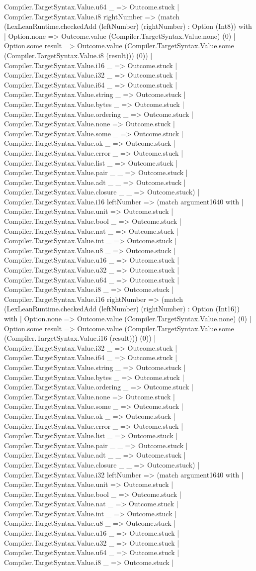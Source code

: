 \documentclass[11pt]{article}
\begin{document}
Compiler.TargetSyntax.Value.u64 \_ => Outcome.stuck | Compiler.TargetSyntax.Value.i8 rightNumber => (match (LexLeanRuntime.checkedAdd (leftNumber) (rightNumber) : Option (Int8)) with | Option.none => Outcome.value (Compiler.TargetSyntax.Value.none) (0) | Option.some result => Outcome.value (Compiler.TargetSyntax.Value.some (Compiler.TargetSyntax.Value.i8 (result))) (0)) | Compiler.TargetSyntax.Value.i16 \_ => Outcome.stuck | Compiler.TargetSyntax.Value.i32 \_ => Outcome.stuck | Compiler.TargetSyntax.Value.i64 \_ => Outcome.stuck | Compiler.TargetSyntax.Value.string \_ => Outcome.stuck | Compiler.TargetSyntax.Value.bytes \_ => Outcome.stuck | Compiler.TargetSyntax.Value.ordering \_ => Outcome.stuck | Compiler.TargetSyntax.Value.none => Outcome.stuck | Compiler.TargetSyntax.Value.some \_ => Outcome.stuck | Compiler.TargetSyntax.Value.ok \_ => Outcome.stuck | Compiler.TargetSyntax.Value.error \_ => Outcome.stuck | Compiler.TargetSyntax.Value.list \_ => Outcome.stuck | Compiler.TargetSyntax.Value.pair \_ \_ => Outcome.stuck | Compiler.TargetSyntax.Value.adt \_ \_ => Outcome.stuck | Compiler.TargetSyntax.Value.closure \_ \_ => Outcome.stuck) | Compiler.TargetSyntax.Value.i16 leftNumber => (match argument1640 with | Compiler.TargetSyntax.Value.unit => Outcome.stuck | Compiler.TargetSyntax.Value.bool \_ => Outcome.stuck | Compiler.TargetSyntax.Value.nat \_ => Outcome.stuck | Compiler.TargetSyntax.Value.int \_ => Outcome.stuck | Compiler.TargetSyntax.Value.u8 \_ => Outcome.stuck | Compiler.TargetSyntax.Value.u16 \_ => Outcome.stuck | Compiler.TargetSyntax.Value.u32 \_ => Outcome.stuck | Compiler.TargetSyntax.Value.u64 \_ => Outcome.stuck | Compiler.TargetSyntax.Value.i8 \_ => Outcome.stuck | Compiler.TargetSyntax.Value.i16 rightNumber => (match (LexLeanRuntime.checkedAdd (leftNumber) (rightNumber) : Option (Int16)) with | Option.none => Outcome.value (Compiler.TargetSyntax.Value.none) (0) | Option.some result => Outcome.value (Compiler.TargetSyntax.Value.some (Compiler.TargetSyntax.Value.i16 (result))) (0)) | Compiler.TargetSyntax.Value.i32 \_ => Outcome.stuck | Compiler.TargetSyntax.Value.i64 \_ => Outcome.stuck | Compiler.TargetSyntax.Value.string \_ => Outcome.stuck | Compiler.TargetSyntax.Value.bytes \_ => Outcome.stuck | Compiler.TargetSyntax.Value.ordering \_ => Outcome.stuck | Compiler.TargetSyntax.Value.none => Outcome.stuck | Compiler.TargetSyntax.Value.some \_ => Outcome.stuck | Compiler.TargetSyntax.Value.ok \_ => Outcome.stuck | Compiler.TargetSyntax.Value.error \_ => Outcome.stuck | Compiler.TargetSyntax.Value.list \_ => Outcome.stuck | Compiler.TargetSyntax.Value.pair \_ \_ => Outcome.stuck | Compiler.TargetSyntax.Value.adt \_ \_ => Outcome.stuck | Compiler.TargetSyntax.Value.closure \_ \_ => Outcome.stuck) | Compiler.TargetSyntax.Value.i32 leftNumber => (match argument1640 with | Compiler.TargetSyntax.Value.unit => Outcome.stuck | Compiler.TargetSyntax.Value.bool \_ => Outcome.stuck | Compiler.TargetSyntax.Value.nat \_ => Outcome.stuck | Compiler.TargetSyntax.Value.int \_ => Outcome.stuck | Compiler.TargetSyntax.Value.u8 \_ => Outcome.stuck | Compiler.TargetSyntax.Value.u16 \_ => Outcome.stuck | Compiler.TargetSyntax.Value.u32 \_ => Outcome.stuck | Compiler.TargetSyntax.Value.u64 \_ => Outcome.stuck | Compiler.TargetSyntax.Value.i8 \_ => Outcome.stuck | 
\end{document}
